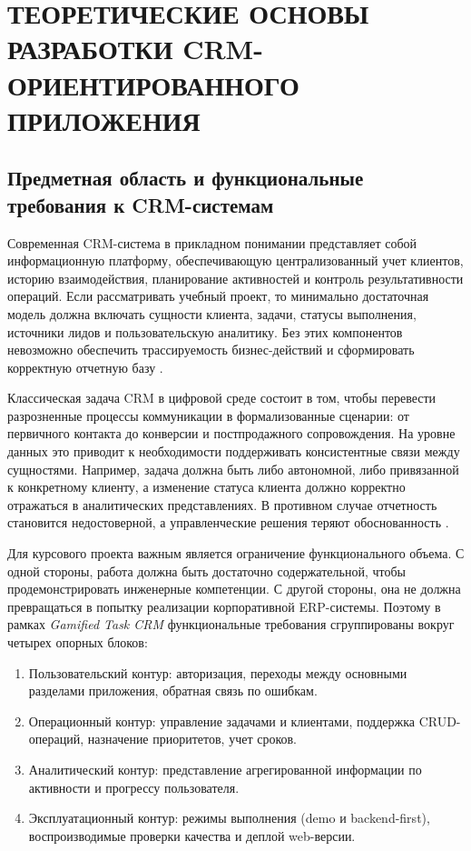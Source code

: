 \clearpage
\section{ТЕОРЕТИЧЕСКИЕ ОСНОВЫ РАЗРАБОТКИ CRM-ОРИЕНТИРОВАННОГО ПРИЛОЖЕНИЯ}

\subsection{Предметная область и функциональные требования к CRM-системам}

Современная CRM-система в прикладном понимании представляет собой информационную платформу, обеспечивающую централизованный учет клиентов, историю взаимодействия, планирование активностей и контроль результативности операций. Если рассматривать учебный проект, то минимально достаточная модель должна включать сущности клиента, задачи, статусы выполнения, источники лидов и пользовательскую аналитику. Без этих компонентов невозможно обеспечить трассируемость бизнес-действий и сформировать корректную отчетную базу \cite{crmBook,projectManagementBook}.

Классическая задача CRM в цифровой среде состоит в том, чтобы перевести разрозненные процессы коммуникации в формализованные сценарии: от первичного контакта до конверсии и постпродажного сопровождения. На уровне данных это приводит к необходимости поддерживать консистентные связи между сущностями. Например, задача должна быть либо автономной, либо привязанной к конкретному клиенту, а изменение статуса клиента должно корректно отражаться в аналитических представлениях. В противном случае отчетность становится недостоверной, а управленческие решения теряют обоснованность \cite{dataDesign2022,isDesign2023}.

Для курсового проекта важным является ограничение функционального объема. С одной стороны, работа должна быть достаточно содержательной, чтобы продемонстрировать инженерные компетенции. С другой стороны, она не должна превращаться в попытку реализации корпоративной ERP-системы. Поэтому в рамках \textit{Gamified Task CRM} функциональные требования сгруппированы вокруг четырех опорных блоков:
\begin{enumerate}
  \item Пользовательский контур: авторизация, переходы между основными разделами приложения, обратная связь по ошибкам.
  \item Операционный контур: управление задачами и клиентами, поддержка CRUD-операций, назначение приоритетов, учет сроков.
  \item Аналитический контур: представление агрегированной информации по активности и прогрессу пользователя.
  \item Эксплуатационный контур: режимы выполнения (demo и backend-first), воспроизводимые проверки качества и деплой web-версии.
\end{enumerate}

